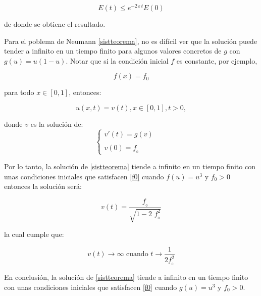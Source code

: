 $$E(t)\leq e^{-2\,\varepsilon\,t}E(0)$$

de donde se obtiene el resultado.

\begin{teorem}\label{sistteoremaproiedad222}
\end{teorem}

Para el poblema de Neumann \eqref{sistteorema}, no es difícil ver que la solución puede tender a infinito en un tiempo finito para algunos valores concretos de $g$ con $g(u)=u(1-u)$. Notar que si la condición inicial $f$ es constante, por ejemplo, 

\begin{equation}
	f(x)=f_0
	\label{f0}
\end{equation}

para todo $x\in[0,1]$, entonces:

$$u(x,t)=v(t), x\in[0,1], t>0,$$

donde $v$ es la solución de:
\[
\left\{ \begin{array}{lcl}
	v'(t)=g(v)  \\
	&     &         \\
	v(0)=f_{_{0}}
\end{array}
\right.
\]

Por lo tanto, la solución de \eqref{sistteorema} tiende a infinito en un tiempo finito con unas condiciones iniciales que satisfacen \eqref{f0} cuando $f(u)=u^{3}$ y $f_0>0$
entonces la solución será:

$$v(t)=\dfrac{f_{_{0}}}{\sqrt{1-2\,\,f^{2}_{_{0}}}}$$

la cual cumple que:

$$v(t)\longrightarrow\infty\mbox{ cuando } t\rightarrow\dfrac{1}{2f^{2}_{_{0}}}$$

En conclusión, la solución de \eqref{sistteorema} tiende a infinito en un tiempo finito con unas condiciones iniciales que satisfacen \eqref{f0} cuando $g(u)=u^{3}$ y $f_0>0$.
	
